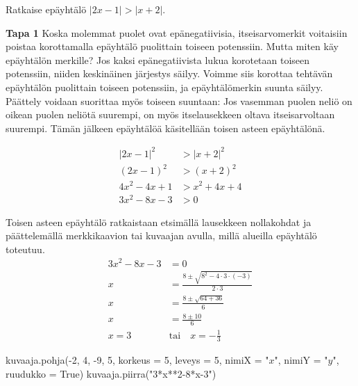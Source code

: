 \begin{esimerkki} Ratkaise epäyhtälö $|2x-1|>|x+2|$.

\begin{esimratk} \textbf{Tapa 1} Koska molemmat puolet ovat epänegatiivisia, itseisarvomerkit voitaisiin poistaa korottamalla epäyhtälö puolittain 		toiseen potenssiin. Mutta miten käy epäyhtälön merkille? Jos kaksi epänegatiivista lukua korotetaan toiseen potenssiin, niiden keskinäinen järjestys säilyy. Voimme siis korottaa tehtävän epäyhtälön puolittain toiseen potenssiin, ja epäyhtälömerkin suunta säilyy. Päättely voidaan suorittaa myös toiseen suuntaan: Jos vasemman puolen neliö on oikean puolen neliötä suurempi, on myös itselausekkeen oltava itseisarvoltaan suurempi. Tämän jälkeen epäyhtälöä käsitellään toisen asteen epäyhtälönä.

\begin{align*}
|2x-1|^2 & >|x+2|^2 \\
(2x-1)^2 & >(x+2)^2 \\
4x^2-4x+1 & >x^2+4x+4 \\
3x^2-8x-3 & >0
\end{align*}

Toisen asteen epäyhtälö ratkaistaan etsimällä lausekkeen nollakohdat ja päättelemällä merkkikaavion tai kuvaajan avulla, millä alueilla epäyhtälö toteutuu.
\begin{align*}
3x^2-8x-3 & =0 \\
x & =\frac{8\pm\sqrt{8^2-4\cdot3\cdot(-3)}}{2\cdot 3} \\
x & =\frac{8\pm\sqrt{64+36}}{6} \\
x & =\frac{8\pm 10}{6} \\
x=3 \quad & \text{tai} \quad x=-\frac{1}{3}
\end{align*}

\begin{merkkikaavio}{2}

	\merkkikaavioMerkki{$+$}
	\merkkikaavioMerkki{$-$}
	\merkkikaavioMerkki{$+$}

\end{merkkikaavio}
\begin{kuva}
  kuvaaja.pohja(-2, 4,  -9, 5, korkeus =  5, leveys = 5, nimiX = "$x$", nimiY = "$y$", ruudukko = True)
  kuvaaja.piirra("3*x**2-8*x-3")
\end{kuva}


\end{esimratk}
\end{esimerkki}
